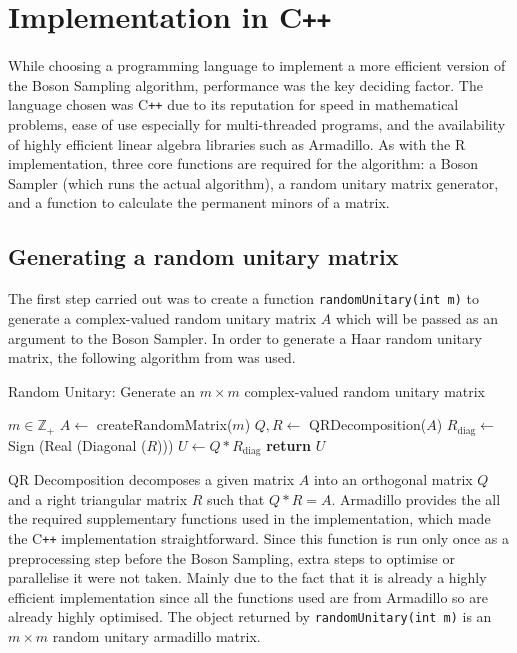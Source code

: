 \documentclass[ %
                    author={Manan Vaswani},
                supervisor={Dr. Raphael Clifford},
                    degree={MEng},
                     title={A multi-core CPU implementation of the classical Boson Sampling algorithm},
                  subtitle={},
                      type={},
                      year={2019} ]{dissertation}
\theoremstyle{plain}
\theoremstyle{definition}
\begin{document}
\section{Implementation in C\texttt{++}}
While choosing a programming language to implement a more efficient version of the Boson Sampling algorithm, performance was the key deciding factor. The language chosen was C\texttt{++} due to its reputation for speed in mathematical problems, ease of use especially for multi-threaded programs, and the availability of highly efficient linear algebra libraries such as Armadillo. As with the R implementation, three core functions are required for the algorithm: a Boson Sampler (which runs the actual algorithm), a random unitary matrix generator, and a function to calculate the permanent minors of a matrix.

\subsection{Generating a random unitary matrix}
The first step carried out was to create a function \texttt{randomUnitary(int m)} to generate a complex-valued random unitary matrix $A$ which will be passed as an argument to the Boson Sampler. In order to generate a Haar random unitary matrix, the following algorithm from \cite{ozols2009} was used.
\begin{algorithm}
\caption{Random Unitary: Generate an $m \times m$ complex-valued random unitary matrix}
\begin{algorithmic}[1]
\Require $m \in \mathbb{Z}_+$
\State $A \leftarrow$ createRandomMatrix($m$)
\State $Q, R \leftarrow$ QRDecomposition($A$)
\State $R_{\text{diag}} \leftarrow$ Sign (Real (Diagonal ($R$)))
\State $U \leftarrow Q * R_{\text{diag}}$
\State \textbf{return} $U$
\end{algorithmic}
\end{algorithm}

QR Decomposition decomposes a given matrix $A$ into an orthogonal matrix $Q$ and a right triangular matrix $R$ such that $Q * R = A$. Armadillo provides the all the required supplementary functions used in the implementation, which made the C\texttt{++} implementation straightforward. Since this function is run only once as a preprocessing step before the Boson Sampling, extra steps to optimise or parallelise it were not taken. Mainly due to the fact that it is already a highly efficient implementation since all the functions used are from Armadillo so are already highly optimised. The object returned by \texttt{randomUnitary(int m)} is an $m \times m$ random unitary armadillo matrix.
\end{document}
